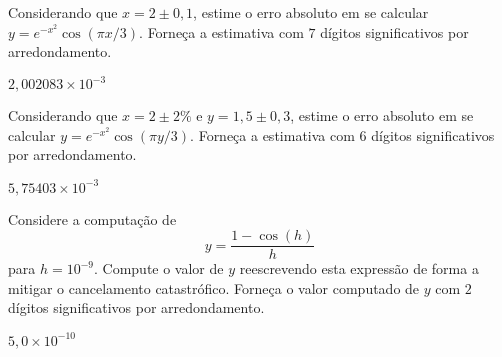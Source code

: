 \begin{exer}\label{exer:properro_abs1}
  Considerando que $x=2\pm 0,1$, estime o erro absoluto em se calcular $y = e^{-x^2}\cos(\pi x/3)$. Forneça a estimativa com $7$ dígitos significativos por arredondamento.
\end{exer}
\begin{resp}
  $2,002083\times 10^{-3}$
\end{resp}

\begin{exer}\label{exer:properro_abs2}
  Considerando que $x=2\pm 2\%$ e $y=1,5\pm 0,3$, estime o erro absoluto em se calcular $y = e^{-x^2}\cos(\pi y/3)$. Forneça a estimativa com $6$ dígitos significativos por arredondamento.
\end{exer}
\begin{resp}
  $5,75403\times 10^{-3}$
\end{resp}

\begin{exer}\label{exer:cancela_1}
  Considere a computação de
  \begin{equation}
    y = \frac{1 - \cos(h)}{h}
  \end{equation}
para $h=10^{-9}$. Compute o valor de $y$ reescrevendo esta expressão de forma a mitigar o cancelamento catastrófico. Forneça o valor computado de $y$ com $2$ dígitos significativos por arredondamento.
\end{exer}
\begin{resp}
  $5,0\times 10^{-10}$
\end{resp}
